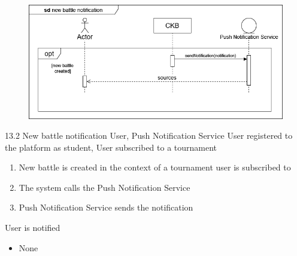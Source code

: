 \usecase
{
    \begin{figure}[H]
        \centering
        \includegraphics[width=\textwidth]{src/sd_diagrams/pushbattle.png}
    \end{figure}
}
{13.2}
{New battle notification} %
{User, Push Notification Service} %
{User registered to the platform as student, User subscribed to a tournament} %
{ %
    \begin{enumerate}
        \item New battle is created in the context of a tournament user is subscribed to
        \item The system calls the Push Notification Service
        \item Push Notification Service sends the notification
    \end{enumerate}
}
{User is notified} %
{ %
    \begin{itemize}
        \item None
    \end{itemize}
}
{ %

}

